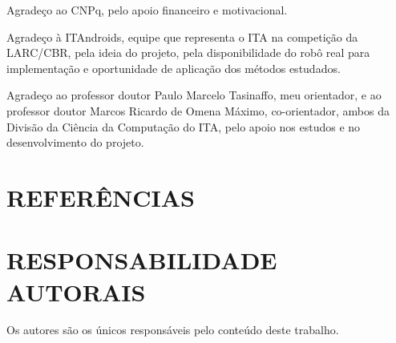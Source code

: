 \documentclass[10pt,fleqn,a4paper]{article}
\begin{document}
	Agradeço ao CNPq, pelo apoio financeiro e motivacional.
	
	Agradeço à ITAndroids, equipe que representa o ITA na competição da LARC/CBR, pela ideia do projeto, pela disponibilidade do robô real para implementação e oportunidade de aplicação dos métodos estudados.

	Agradeço ao professor doutor Paulo Marcelo Tasinaffo, meu orientador, e ao professor doutor Marcos Ricardo de Omena Máximo, co-orientador, ambos da Divisão da Ciência da Computação do ITA, pelo apoio nos estudos e no desenvolvimento do projeto.

    \section{REFERÊNCIAS}
        
        

    \section{RESPONSABILIDADE AUTORAIS}
    
        Os autores são os únicos responsáveis pelo conteúdo deste trabalho.
\end{document}
